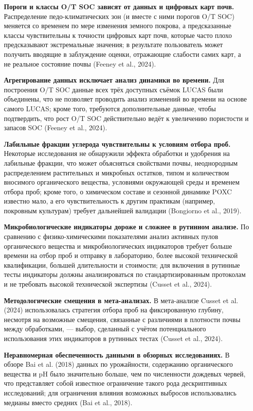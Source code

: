 \documentclass[11pt,a4paper]{article}
\begin{document}
\textbf{Пороги и классы O/T SOC зависят от данных и цифровых карт почв.}
Распределение педо-климатических зон (и вместе с ними порогов O/T SOC)
меняется со временем по мере изменения земного покрова, а предсказанные классы
чувствительны к точности цифровых карт почв, которые часто плохо предсказывают
экстремальные значения; в результате пользователь может получить вводящие в
заблуждение оценки, отражающие слабости самих карт, а не реальное состояние
почвы (Feeney et al., 2024).

\textbf{Агрегирование данных исключает анализ динамики во времени.} Для
построения O/T SOC данные всех трёх доступных съёмок LUCAS были объединены,
что не позволяет проводить анализ изменений во времени на основе самого LUCAS;
кроме того, требуются дополнительные данные, чтобы подтвердить, что рост
O/T SOC действительно ведёт к увеличению пористости и запасов SOC
(Feeney et al., 2024).

\textbf{Лабильные фракции углерода чувствительны к условиям отбора проб.}
Некоторые исследования не обнаружили эффекта обработки и удобрения на
лабильные фракции, что может объясняться свойствами почвы, неоднородным
распределением растительных и микробных остатков, типом и количеством
вносимого органического вещества, условиями окружающей среды и временем
отбора проб; кроме того, о химическом составе и сезонной динамике POXC
известно мало, а его чувствительность к другим практикам (например, покровным
культурам) требует дальнейшей валидации (Bongiorno et al., 2019).

\textbf{Микробиологические индикаторы дороже и сложнее в рутинном анализе.}
По сравнению с физико-химическими показателями анализ активных пулов
органического вещества и микробиологических индикаторов требует больше времени
на отбор проб и отправку в лабораторию, более высокой технической
квалификации, большей длительности и стоимости; для включения в рутинные тесты
индикаторы должны анализироваться по стандартизированным протоколам и не
требовать высокой технической экспертизы (Cusset et al., 2024).

\textbf{Методологические смещения в мета-анализах.} В мета-анализе Cusset et
al. (2024) использовалась стратегия отбора проб на фиксированную глубину,
несмотря на возможные смещения, связанные с различиями в плотности почвы между
обработками, --- выбор, сделанный с учётом потенциального использования этих
индикаторов в рутинных тестах (Cusset et al., 2024).

\textbf{Неравномерная обеспеченность данными в обзорных исследованиях.} В
обзоре Bai et al. (2018) данных по урожайности, содержанию органического
вещества и pH было значительно больше, чем по численности дождевых червей,
что представляет собой известное ограничение такого рода дескриптивных
исследований; для ограничения влияния возможных выбросов использовались
медианы вместо средних (Bai et al., 2018).
\end{document}
